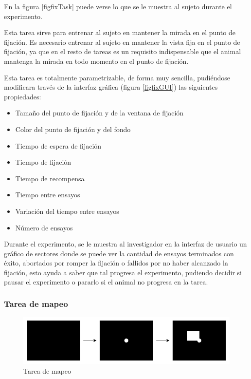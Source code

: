 \documentclass[conference]{IEEEtran}
\begin{document}
En la figura \ref{figfixTask} puede verse lo que se le muestra al sujeto durante el experimento. 

Esta tarea sirve para entrenar al sujeto en mantener la mirada en el punto de fijación. Es necesario entrenar al sujeto en mantener la vista fija en el punto de fijación, ya que en el resto de tareas es un requisito indispensable que el animal mantenga la mirada en todo momento en el punto de fijación.

Esta tarea es totalmente parametrizable, de forma muy sencilla, pudiéndose modificara través de la interfaz gráfica (figura \ref{figfixGUI}) las siguientes propiedades:
\begin{itemize}
	\item Tamaño del punto de fijación y de la ventana de fijación
	\item Color del punto de fijación y del fondo
	\item Tiempo de espera de fijación
	\item Tiempo de fijación
	\item Tiempo de recompensa
	\item Tiempo entre ensayos
	\item Variación del tiempo entre ensayos
	\item Número de ensayos
\end{itemize}

Durante el experimento, se le muestra al investigador en la interfaz de usuario un gráfico de sectores donde se puede ver la cantidad de ensayos terminados con éxito, abortados por romper la fijación o fallidos por no haber alcanzado la fijación, esto ayuda a saber que tal progresa el experimento, pudiendo decidir si pausar el experimento o pararlo si el animal no progresa en la tarea.

\subsubsection*{Tarea de mapeo}

\begin{figure}[htbp]
\centerline{\includegraphics[width=\linewidth]{figures/mapping_task}}
\caption{Tarea de mapeo}
\label{figMapTask}
\end{figure}
\end{document}
